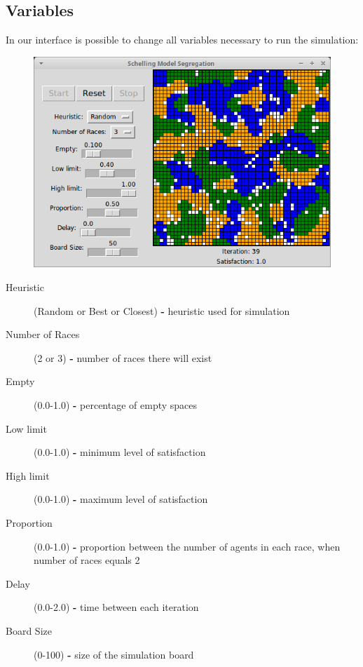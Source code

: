 \documentclass[a4paper,titlepage,11pt]{article}
\begin{document}
\newpage

\subsection{Variables}
In our interface is possible to change all variables necessary to run the simulation:

\begin{figure}[h]
    \centering
    \includegraphics[scale=0.50]{img/interface.png}
\end{figure}

\begin{description}
\item [ Heuristic ] (Random or Best or Closest) \textbf{-} heuristic used for simulation
\item [ Number of Races ] (2 or 3) \textbf{-} number of races there will exist
\item [ Empty ] (0.0-1.0) \textbf{-} percentage of empty spaces
\item [ Low limit ] (0.0-1.0) \textbf{-} minimum level of satisfaction
\item [ High limit ] (0.0-1.0) \textbf{-} maximum level of satisfaction
\item [ Proportion ] (0.0-1.0) \textbf{-} proportion between the number of agents in each race, when number of races equals 2
\item [ Delay ] (0.0-2.0) \textbf{-} time between each iteration
\item [ Board Size ] (0-100) \textbf{-} size of the simulation board
\end{description}

\newpage
\end{document}
